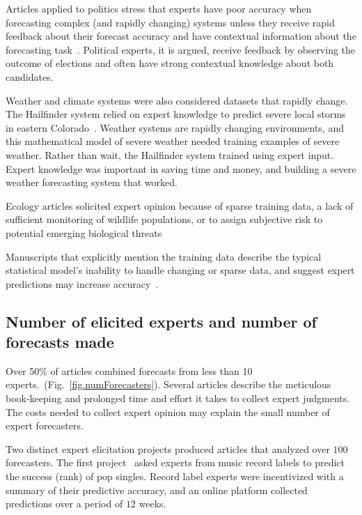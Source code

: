 \documentclass[preprint,authoryear,nonatbib]{elsarticle}
\begin{document}
Articles applied to politics stress that experts have poor accuracy when forecasting complex (and rapidly changing) systems unless they receive rapid feedback about their forecast accuracy and have contextual information about the forecasting task~\parencite{graefe2014accuracy,graefe2015accuracy,graefe2018predicting,satopaa2014probability}.
Political experts, it is argued, receive feedback by observing the outcome of elections and often have strong contextual knowledge about both candidates.  

Weather and climate systems were also considered datasets that rapidly change.
The Hailfinder system relied on expert knowledge to predict severe local storms in eastern Colorado~\parencite{abramson1996hailfinder}.
Weather systems are rapidly changing environments, and this mathematical model of severe weather needed training examples of severe weather.
Rather than wait, the Hailfinder system trained using expert input.
Expert knowledge was important in saving time and money, and building a severe weather forecasting system that worked.

Ecology articles solicited expert opinion because of sparse training data, a lack of sufficient monitoring of wildlife populations, or to assign subjective risk to potential emerging biological threats~\parencite{li2012preliminary,mantyka2014understanding,kurowicka2010probabilistic}

Manuscripts that explicitly mention the training data describe the typical statistical model's inability to handle changing or sparse data, and suggest expert predictions may increase accuracy~\parencite{seifert2013relative,song2013combining}.

\subsection{Number of elicited experts and number of forecasts made}

Over 50\% of articles combined forecasts from less than 10 experts.~(Fig.~\ref{fig.numForecasters}).
Several articles describe the meticulous book-keeping and prolonged time and effort it takes to collect expert judgments.
The costs needed to collect expert opinion may explain the small number of expert forecasters.

Two distinct expert elicitation projects produced articles that analyzed over $100$ forecasters.
The first project~\parencite{seifert2013relative} asked experts from music record labels to predict the success (rank) of pop singles.
Record label experts were incentivized with a summary of their predictive accuracy, and 
an online platform collected predictions over a period of $12$ weeks.
\end{document}
